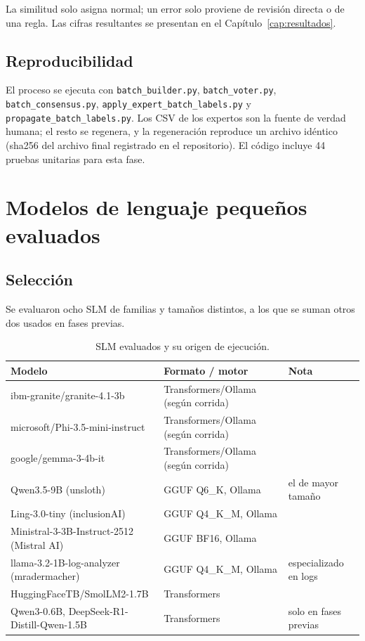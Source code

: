 La similitud solo asigna normal; un error solo proviene de revisión directa o de una regla. Las cifras resultantes se presentan en el Capítulo~\ref{cap:resultados}.

\subsection{Reproducibilidad}

El proceso se ejecuta con \texttt{batch\_builder.py}, \texttt{batch\_voter.py}, \texttt{batch\_consensus.py}, \texttt{apply\_expert\_batch\_labels.py} y \texttt{propagate\_batch\_labels.py}. Los CSV de los expertos son la fuente de verdad humana; el resto se regenera, y la regeneración reproduce un archivo idéntico (sha256 del archivo final registrado en el repositorio). El código incluye 44 pruebas unitarias para esta fase.

\section{Modelos de lenguaje pequeños evaluados}\label{sec:met_slm}

\subsection{Selección}

Se evaluaron ocho SLM de familias y tamaños distintos, a los que se suman otros dos usados en fases previas.

\begin{table}[H]
\centering
\caption{SLM evaluados y su origen de ejecución.}
\label{tab:met_modelos}
\small
\begin{tabular}{@{}p{5.2cm}p{4.2cm}p{4.6cm}@{}}
\toprule
\textbf{Modelo} & \textbf{Formato / motor} & \textbf{Nota} \\
\midrule
ibm-granite/granite-4.1-3b & Transformers/Ollama (según corrida) & \\
microsoft/Phi-3.5-mini-instruct & Transformers/Ollama (según corrida) & \\
google/gemma-3-4b-it & Transformers/Ollama (según corrida) & \\
Qwen3.5-9B (unsloth) & GGUF Q6\_K, Ollama & el de mayor tamaño \\
Ling-3.0-tiny (inclusionAI) & GGUF Q4\_K\_M, Ollama & \\
Ministral-3-3B-Instruct-2512 (Mistral AI) & GGUF BF16, Ollama & \\
llama-3.2-1B-log-analyzer (mradermacher) & GGUF Q4\_K\_M, Ollama & especializado en logs \\
HuggingFaceTB/SmolLM2-1.7B & Transformers & \\
Qwen3-0.6B, DeepSeek-R1-Distill-Qwen-1.5B & Transformers & solo en fases previas \\
\bottomrule
\end{tabular}
\normalsize
\end{table}

